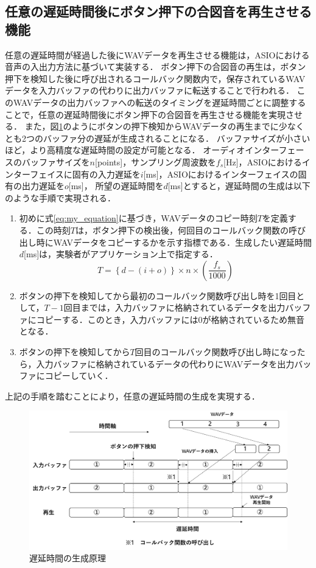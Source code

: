 \subsection{任意の遅延時間後にボタン押下の合図音を再生させる機能}
任意の遅延時間が経過した後にWAVデータを再生させる機能は，ASIOにおける音声の入出力方法に基づいて実装する．
ボタン押下の合図音の再生は，ボタン押下を検知した後に呼び出されるコールバック関数内で，保存されているWAVデータを入力バッファの代わりに出力バッファに転送することで行われる．
このWAVデータの出力バッファへの転送のタイミングを遅延時間ごとに調整することで，任意の遅延時間後にボタン押下の合図音を再生させる機能を実現させる．
また，図\ref{fig:delay_theory}のようにボタンの押下検知からWAVデータの再生までに少なくとも2つのバッファ分の遅延が生成されることになる．
バッファサイズが小さいほど，より高精度な遅延時間の設定が可能となる．
オーディオインターフェースのバッファサイズを$n$[points]，サンプリング周波数を$f_{s}$[Hz]，ASIOにおけるインターフェイスに固有の入力遅延を$i$[ms]，ASIOにおけるインターフェイスの固有の出力遅延を$o$[ms]，
所望の遅延時間を$d$[ms]とすると，遅延時間の生成は以下のような手順で実現される．
\begin{enumerate}[leftmargin=*]
  \item 初めに式\ref{eq:my_equation}に基づき，WAVデータのコピー時刻$T$を定義する．この時刻$T$は，ボタン押下の検出後，何回目のコールバック関数の呼び出し時にWAVデータをコピーするかを示す指標である．生成したい遅延時間$d$[ms]は，実験者がアプリケーション上で指定する．
\begin{equation}
T = \left\{ d - (i + o) \right\} \times n \times \left( \frac{f_s}{1000} \right) \label{eq:my_equation}
\end{equation}

  \item ボタンの押下を検知してから最初のコールバック関数呼び出し時を1回目として，$T-1$回目までは，入力バッファに格納されているデータを出力バッファにコピーする．このとき，入力バッファには0が格納されているため無音となる．
  \item ボタンの押下を検知してから$T$回目のコールバック関数呼び出し時になったら，入力バッファに格納されているデータの代わりにWAVデータを出力バッファにコピーしていく．
\end{enumerate}
上記の手順を踏むことにより，任意の遅延時間の生成を実現する．
\begin{figure}[h]
  \centering
  \includegraphics[scale=0.12]{figures/System/Delay_theory.pdf}
  \caption{遅延時間の生成原理}
  \label{fig:delay_theory}
\end{figure}
